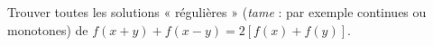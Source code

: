 Trouver toutes les solutions « régulières » (\emph{tame} : par exemple continues ou monotones) de $f(x + y) + f(x - y) = 2[f(x) + f(y)]$.
